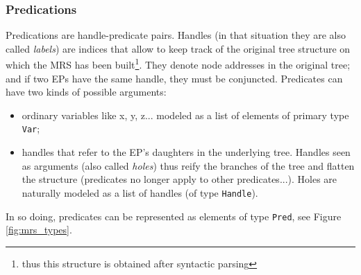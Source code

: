 \documentclass[11pt]{article}
\begin{document}
			\subsubsection{Predications}
				Predications are handle-predicate pairs. Handles (in that situation they are also called \textit{labels}) are indices that allow to keep track of the original tree structure on which the MRS has been built\footnote{thus this structure is obtained after syntactic parsing}. They denote node addresses in the original tree; and if two EPs have the same handle, they must be conjuncted. Predicates can have two kinds of possible arguments:
				\begin{itemize}
					\item ordinary variables like x, y, z... modeled as a list of elements of primary type \texttt{Var};
					\item handles that refer to the EP's daughters in the underlying tree. Handles seen as arguments (also called \textit{holes}) thus reify the branches of the tree and flatten the structure (predicates no longer apply to other predicates...). Holes are naturally modeled as a list of handles (of type \texttt{Handle}).
				\end{itemize}
				In so doing, predicates can be represented as elements of type \texttt{Pred}, see Figure \ref{fig:mrs_types}.
\end{document}
